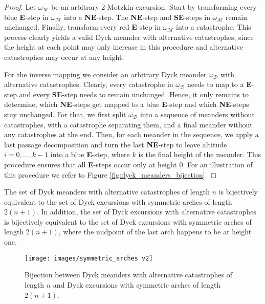 \begin{proof}
  Let $\omega_\mathcal{M}$ be an arbitrary 2-Motzkin excursion. 
  Start by transforming every blue {\color{lightblue} \textbf{E}}-step in $\omega_\mathcal{M}$ into a \textbf{NE}-step. 
  The \textbf{NE}-step and \textbf{SE}-steps in $\omega_\mathcal{M}$ remain unchanged.
  Finally, transform every red {\color{catred}\textbf{E}}-step in $\omega_\mathcal{M}$ into a catastrophe.
  This process clearly yields a valid Dyck meander with alternative catastrophes, since the height at each point may only increase in this procedure and alternative catastrophes may occur at any height.

  For the inverse mapping we consider an arbitrary Dyck meander $\omega_\mathcal{D}$ with alternative catastrophes. Clearly, every catastrophe in $\omega_\mathcal{D}$ needs to map to a {\color{catred}\textbf{E}}-step and every \textbf{SE}-step needs to remain unchanged.
  Hence, it only remains to determine, which \textbf{NE}-steps get mapped to a blue {\color{lightblue} \textbf{E}}-step and which \textbf{NE}-steps stay unchanged. For that, we first split $\omega_\mathcal{D}$ into a sequence of meanders without catastrophes, with a catastrophe separating them, and a final meander without any catastrophes at the end.
  Then, for each meander in the sequence, we apply a last passage decomposition and turn the last \textbf{NE}-step to leave altitude $i = 0, \dots, k - 1$ into a blue {\color{lightblue} \textbf{E}}-step, where $k$ is the final height of the meander. This procedure ensures that all \textbf{E}-steps occur only at height $0$.
  For an illustration of this procedure we refer to Figure \ref{fig:dyck_meanders_bijection}.
\end{proof}

\begin{theorem}
  \label{thm:dyck_meanders_bijection}
  The set of Dyck meanders with alternative catastrophes of length $n$ is bijectively equivalent to the set of Dyck excursions with symmetric arches of length $2(n+1)$. 
  In addition, the set of Dyck excursions with alternative catastrophes is bijectively equivalent to the set of Dyck excursions with symmetric arches of length $2(n+1)$, where the midpoint of the last arch happens to be at height one.
\end{theorem}

\begin{figure}[hbt!]          
  \centering
  \texttt{[image: images/symmetric\_arches v2]}
  \caption[Bijection involving Dyck meanders with alternative catastrophes and symmetric arches.]{Bijection between Dyck meanders with alternative catastrophes of length $n$ and Dyck excursions with symmetric arches of length $2(n+1)$.}
  \label{fig:dyck_meanders_bijection2}
\end{figure}


